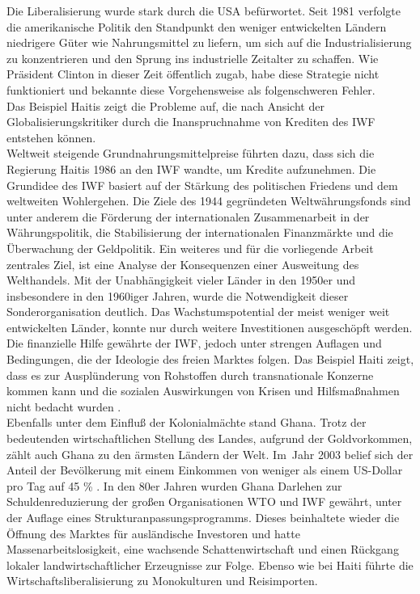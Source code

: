 %
 Die Liberalisierung wurde stark durch die USA befürwortet. Seit 1981 verfolgte die amerikanische Politik den Standpunkt den weniger entwickelten Ländern niedrigere Güter wie Nahrungsmittel zu liefern, um sich auf die Industrialisierung zu konzentrieren und den Sprung ins industrielle Zeitalter zu schaffen.  Wie Präsident Clinton in dieser Zeit öffentlich zugab, habe diese Strategie nicht funktioniert und bekannte diese Vorgehensweise als folgenschweren Fehler.\\
%
Das Beispiel Haitis zeigt die Probleme auf, die nach Ansicht der Globalisierungskritiker durch die Inanspruchnahme von Krediten des IWF entstehen können. \\
%
 Weltweit steigende Grundnahrungsmittelpreise führten dazu, dass sich die Regierung Haitis 1986 an den IWF wandte, um Kredite aufzunehmen. Die Grundidee des IWF basiert auf der Stärkung des politischen Friedens und dem weltweiten Wohlergehen. Die Ziele des 1944 gegründeten Weltwährungsfonds sind unter anderem die Förderung der internationalen Zusammenarbeit in der Währungspolitik, die Stabilisierung der internationalen Finanzmärkte und die Überwachung der Geldpolitik.  Ein weiteres und für die vorliegende Arbeit zentrales Ziel, ist eine Analyse der Konsequenzen einer Ausweitung des Welthandels.
 Mit der Unabhängigkeit vieler Länder in den  1950er und insbesondere in den 1960iger Jahren, wurde die Notwendigkeit dieser Sonderorganisation deutlich. Das Wachstumspotential der meist weniger weit entwickelten Länder, konnte nur durch weitere Investitionen ausgeschöpft werden. Die finanzielle Hilfe gewährte der IWF, jedoch unter strengen Auflagen und Bedingungen, die der Ideologie des freien Marktes folgen. Das Beispiel Haiti zeigt, dass es zur Ausplünderung von Rohstoffen durch transnationale Konzerne kommen kann und die sozialen Auswirkungen von Krisen und Hilfsmaßnahmen nicht bedacht wurden \cite{IBP.2013}.\\
%
Ebenfalls unter dem Einfluß der Kolonialmächte stand Ghana. Trotz der bedeutenden wirtschaftlichen Stellung des Landes, aufgrund der Goldvorkommen, zählt auch Ghana zu den ärmsten Ländern der Welt. Im~Jahr 2003 belief sich der Anteil der Bevölkerung mit einem Einkommen von weniger als einem US-Dollar pro Tag auf 45 {\%} \cite{Regeher.2013}. In den 80er Jahren wurden Ghana Darlehen zur Schuldenreduzierung der großen Organisationen WTO und IWF gewährt, unter der Auflage eines Strukturanpassungsprogramms. Dieses beinhaltete wieder die Öffnung des Marktes für ausländische Investoren und hatte Massenarbeitslosigkeit, eine wachsende Schattenwirtschaft und einen Rückgang lokaler landwirtschaftlicher Erzeugnisse zur Folge. Ebenso wie bei Haiti führte die Wirtschaftsliberalisierung zu Monokulturen und Reisimporten. \\
